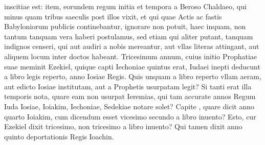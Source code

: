 inscitiae est: item, eorundem regum initia et tempora a Beroso Chaldaeo,
qui minus quam tribus saeculis post illos vixit, et qui quae Actis
ac fastis Babyloniorum publicis continebantur, ignorare non potuit,
haec inquam, non tantum tanquam vera haberi postulamus, sed etiam
qui aliter putant, tanquam indignos censeri, qui aut audiri a nobis
mereantur, aut vllas literas attingant, aut aliquem locum inter
doctos habeant.
Tricesimum annum, cuius initio Prophatiae suae
meminit Ezekiel, quique capti Iechoniae quintus erat, Iudaei inepti
deducunt a libro legis reperto, anno  Iosiae Regis.
Quis unquam a libro reperto vllam aeram, aut edicto
 Iosiae institutam, aut a
Prophetis usurpatam legit?
Si tanti erat illa temporis nota, quare
eam non usurpat Ieremias, qui tam accurate annos Regum Iuda Iosiae,
Ioiakim, Iechoniae, Sedekiae notare solet?
Capite , quare dicit
anno quarto Ioiakim, cum dicendum esset vicesimo secundo a libro
inuento?
Esto, cur Ezekiel dixit tricesimo, non tricesimo a libro inuento?
Qui tamen dixit anno quinto deportationis Regis Ioachin.

